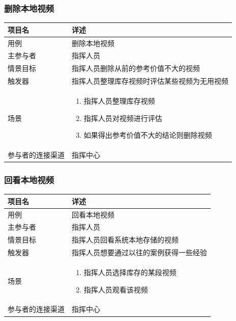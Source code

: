 \documentclass{ctexrep}
\begin{document}
\subsubsection{删除本地视频}
\begin{longtable}{p{2cm} | p{10cm}}
\hline
项目名 & 详述 \\
\hline
\hline
用例 & 删除本地视频\\
\hline
主参与者 & 指挥人员 \\
\hline
情景目标 &  指挥人员删除从前的参考价值不大的视频\\
\hline
触发器 &  指挥人员整理库存视频时评估某些视频为无用视频\\
\hline
场景 & \begin{enumerate}
	\item 指挥人员整理库存视频
	\item 指挥人员对视频进行评估
	\item 如果得出参考价值不大的结论则删除视频
\end{enumerate} \\
\hline
参与者的连接渠道 & 指挥中心 \\
\hline
\end{longtable}

\subsubsection{回看本地视频}
\begin{longtable}{p{2cm} | p{10cm}}
\hline
项目名 & 详述 \\
\hline
\hline
用例 & 回看本地视频\\
\hline
主参与者 & 指挥人员 \\
\hline
情景目标 &  指挥人员回看系统本地存储的视频\\
\hline
触发器 &  指挥人员想要通过以往的案例获得一些经验\\
\hline
场景 & \begin{enumerate}
	\item 指挥人员选择库存的某段视频
	\item 指挥人员观看该视频
\end{enumerate} \\
\hline
参与者的连接渠道 & 指挥中心 \\
\hline
\end{longtable}
\end{document}
